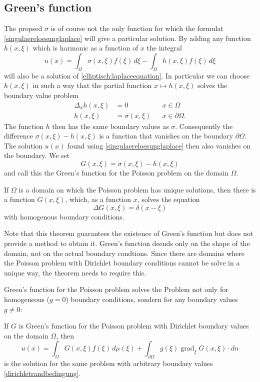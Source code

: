 \subsection{Green's function}
The propsed $\sigma$ is of course not the only function for which
the formulat \eqref{singulaereloesunglaplace} will give a particular solution.
By adding any function $h(x,\xi)$ which is harmonic as a function of $x$
the integral
\[
u(x)=\int_{\Omega}\sigma(x,\xi)f(\xi)\,d\xi-\int_{\Omega}h(x,\xi)f(\xi)\,d\xi
\]
will also be a solution of
\eqref{elliptisch:laplaceequation}.
In particular we can choose $h(x,\xi)$ in such a way that
the partial function
$x\mapsto h(x,\xi)$
solves the boundary value problem
\begin{align*}
\Delta_x h(x,\xi)&=0&&x\in\Omega\\
h(x,\xi)&=\sigma(x,\xi)&&x\in\partial\Omega.
\end{align*}
The function $h$ then has the same boundary values as $\sigma$.
Consequently the difference $\sigma(x,\xi)-h(x,\xi)$ is a function
that vanishes on the boundary $\partial\Omega$.
The solution $u(x)$ found using \eqref{singulaereloesunglaplace}
then also vanishes on the boundary.
We set
\[
G(x,\xi)=\sigma(x,\xi)-h(x,\xi)
\]
and call this the Green's function for the Poisson problem on the
domain $\Omega$.

\begin{satz}If $\Omega$ is a domain on which the Poisson problem
has unique solutions, then there is a function $G(x,\xi)$,
which, as a function $x$, solves the equation
\[
\Delta G(x,\xi)=\delta(x-\xi)
\]
with homogenous boundary conditions.
\end{satz}

Note that this theorem guarantees the existence of Green's function 
but does not provide a method to obtain it.
Green's function deends only on the shape of the domain, not on
the actual boundary condtions.
Since there are domains where the Poisson problem with Dirichlet
boundary conditions cannot be solve in a unique way, the theorem
needs to require this.

Green's function for the Poisson problem solves the Problem
not only for homogeneous ($g=0$) boundary conditions, sondern
for any boundary values $g\ne 0$:

\begin{satz}
\label{dirichletloesung}
If $G$ is Green's function for the Poisson problem with Dirichlet
boundary values on the domain $\Omega$, then
\[
u(x)
=
\int_{\Omega}G(x,\xi)f(\xi)\,d\mu(\xi)
+
\int_{\partial\Omega}g(\xi)\operatorname{grad}_\xi G(x,\xi)\cdot dn
\]
is the solution for the same problem with arbitrary boundary values
\eqref{dirichletrandbedingung}.
\end{satz}


